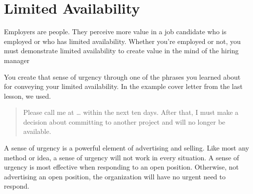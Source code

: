 \documentclass[12pt]{article}
\begin{document}
\section{Limited Availability}

Employers are people. They perceive more value in a job candidate who is
employed or who has limited availability. Whether you're employed or
not, you must demonstrate limited availability to create value in the
mind of the hiring manager

You create that sense of urgency through one of the phrases you learned
about for conveying your limited availability. In the example cover
letter from the last lesson, we used.

\begin{quote}
Please call me at \ldots{} within the next ten days. After that, I must
make a decision about committing to another project and will no longer
be available.
\end{quote}

A sense of urgency is a powerful element of advertising and selling.
Like most any method or idea, a sense of urgency will not work in every
situation. A sense of urgency is most effective when responding to an
open position. Otherwise, not advertising an open position, the
organization will have no urgent need to respond.
\end{document}
